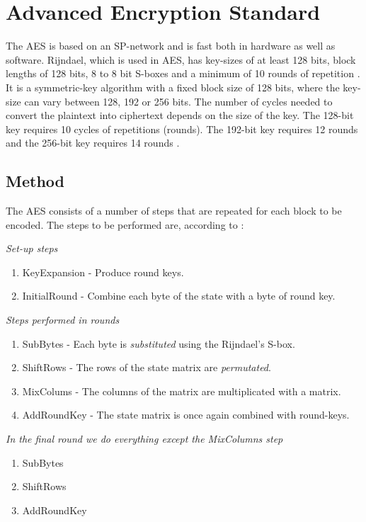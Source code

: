 \chapter{Advanced Encryption Standard}\label{ch:AES}
The AES is based on an SP-network and is fast both in hardware as well as 
software. Rijndael, which is used in AES, has key-sizes of at least 128 bits, 
block lengths of 128 bits, 8 to 8 bit S-boxes and a minimum of 10 rounds of 
repetition \citep[p. 79]{Stinson:2006}. It is a symmetric-key algorithm with a 
fixed block size of 128 bits, where the key-size can vary between 128, 192 or 
256 bits. The number of cycles needed to convert the plaintext into ciphertext 
depends on the size of the key. The 128-bit key requires 10 cycles of 
repetitions (rounds). The 192-bit key requires 12 rounds and the 256-bit key 
requires 14 rounds \citep[p. 103]{Stinson:2006}.

\section{Method}
The AES consists of a number of steps that are repeated for each block to be 
encoded. The steps to be performed are, according to \citet{Stinson:2006}:

\emph{Set-up steps}
\begin{enumerate}
\item KeyExpansion - Produce round keys.
\item InitialRound - Combine each byte of the state with a byte of round key.
\end{enumerate}
\emph{Steps performed in rounds}
\begin{enumerate}
\item SubBytes - Each byte is \emph{substituted} using the Rijndael's S-box.
\item ShiftRows - The rows of the state matrix are \emph{permutated}.
\item MixColums - The columns of the matrix are multiplicated with a matrix.
\item AddRoundKey - The state matrix is once again combined with round-keys.
\end{enumerate}
\emph{In the final round we do everything except the MixColumns step}
\begin{enumerate}
\item SubBytes
\item ShiftRows
\item AddRoundKey
\end{enumerate}

